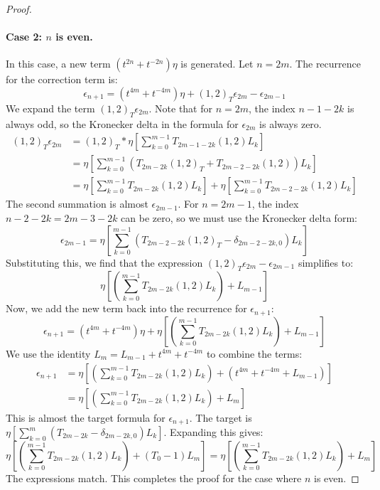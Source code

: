 \documentclass[12pt]{article}
\begin{document}
\begin{proof}
\paragraph{Case 2: $n$ is even.}
In this case, a new term $(t^{2n} + t^{-2n})\eta$ is generated. Let $n=2m$. The recurrence for the correction term is:
\begin{equation*}
\epsilon_{n+1} = (t^{4m} + t^{-4m})\eta + (1,2)_T \epsilon_{2m} - \epsilon_{2m-1}
\end{equation*}
We expand the term $(1,2)_T\epsilon_{2m}$. Note that for $n=2m$, the index $n-1-2k$ is always odd, so the Kronecker delta in the formula for $\epsilon_{2m}$ is always zero.
\begin{align*}
(1,2)_T \epsilon_{2m} &= (1,2)_T \ast \eta \left[ \sum_{k=0}^{m-1} T_{2m-1-2k}(1,2) L_k \right] \\
&= \eta \left[ \sum_{k=0}^{m-1} (T_{2m-2k}(1,2)_T + T_{2m-2-2k}(1,2)) L_k \right] \\
&= \eta \left[ \sum_{k=0}^{m-1} T_{2m-2k}(1,2)L_k \right] + \eta \left[ \sum_{k=0}^{m-1} T_{2m-2-2k}(1,2)L_k \right]
\end{align*}
The second summation is almost $\epsilon_{2m-1}$. For $n=2m-1$, the index $n-2-2k = 2m-3-2k$ can be zero, so we must use the Kronecker delta form:
\begin{equation*}
\epsilon_{2m-1} = \eta \left[ \sum_{k=0}^{m-1} (T_{2m-2-2k}(1,2)_T - \delta_{2m-2-2k,0}) L_k \right]
\end{equation*}
Substituting this, we find that the expression $(1,2)_T\epsilon_{2m} - \epsilon_{2m-1}$ simplifies to:
\begin{equation*}
\eta \left[ \left( \sum_{k=0}^{m-1} T_{2m-2k}(1,2)L_k \right) + L_{m-1} \right]
\end{equation*}
Now, we add the new term back into the recurrence for $\epsilon_{n+1}$:
\begin{equation*}
\epsilon_{n+1} = (t^{4m} + t^{-4m})\eta + \eta \left[ \left( \sum_{k=0}^{m-1} T_{2m-2k}(1,2)L_k \right) + L_{m-1} \right]
\end{equation*}
We use the identity $L_m = L_{m-1} + t^{4m} + t^{-4m}$ to combine the terms:
\begin{align*}
\epsilon_{n+1} &= \eta \left[ \left( \sum_{k=0}^{m-1} T_{2m-2k}(1,2)L_k \right) + (t^{4m} + t^{-4m} + L_{m-1}) \right] \\
&= \eta \left[ \left( \sum_{k=0}^{m-1} T_{2m-2k}(1,2)L_k \right) + L_m \right]
\end{align*}
This is almost the target formula for $\epsilon_{n+1}$. The target is $\eta \left[ \sum_{k=0}^{m} (T_{2m-2k} - \delta_{2m-2k,0}) L_k \right]$. Expanding this gives:
\begin{equation*}
\eta \left[ \left( \sum_{k=0}^{m-1} T_{2m-2k}(1,2)L_k \right) + (T_0-1)L_m \right] = \eta \left[ \left( \sum_{k=0}^{m-1} T_{2m-2k}(1,2)L_k \right) + L_m \right]
\end{equation*}
The expressions match. This completes the proof for the case where $n$ is even.
\end{proof}
\end{document}
